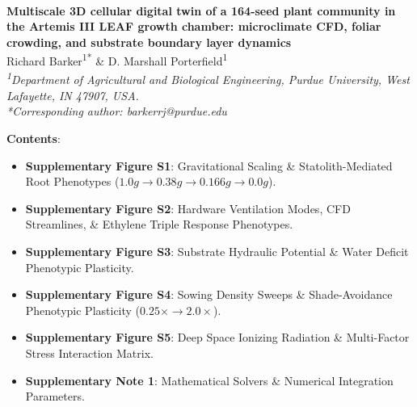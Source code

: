 \documentclass[10pt,a4paper]{article}
\begin{document}
\begin{tcolorbox}[colback=npjlgt,colframe=npjblue,arc=2mm,boxrule=1pt,left=5mm,right=5mm,top=4mm,bottom=4mm]
  \\[4pt]
  {\fontsize{11bp}{14bp}\selectfont\textbf{Multiscale 3D cellular digital twin of a 164-seed plant community in the Artemis III LEAF growth chamber: microclimate CFD, foliar crowding, and substrate boundary layer dynamics}}\\[6pt]
  {\fontsize{9bp}{11bp}\selectfont Richard Barker\textsuperscript{1*} \& D. Marshall Porterfield\textsuperscript{1}}\\[2pt]
  {\fontsize{8bp}{10bp}\selectfont\textit{\textsuperscript{1}Department of Agricultural and Biological Engineering, Purdue University, West Lafayette, IN 47907, USA.}}\\[2pt]
  {\fontsize{8bp}{10bp}\selectfont\textit{*Corresponding author: barkerrj@purdue.edu}}
\end{tcolorbox}

\vspace{1em}

\noindent\textbf{Contents}:
\begin{itemize}
    \item \textbf{Supplementary Figure S1}: Gravitational Scaling \& Statolith-Mediated Root Phenotypes ($1.0g \to 0.38g \to 0.166g \to 0.0g$).
    \item \textbf{Supplementary Figure S2}: Hardware Ventilation Modes, CFD Streamlines, \& Ethylene Triple Response Phenotypes.
    \item \textbf{Supplementary Figure S3}: Substrate Hydraulic Potential \& Water Deficit Phenotypic Plasticity.
    \item \textbf{Supplementary Figure S4}: Sowing Density Sweeps \& Shade-Avoidance Phenotypic Plasticity ($0.25\times \to 2.0\times$).
    \item \textbf{Supplementary Figure S5}: Deep Space Ionizing Radiation \& Multi-Factor Stress Interaction Matrix.
    \item \textbf{Supplementary Note 1}: Mathematical Solvers \& Numerical Integration Parameters.
\end{itemize}

\clearpage
\end{document}
